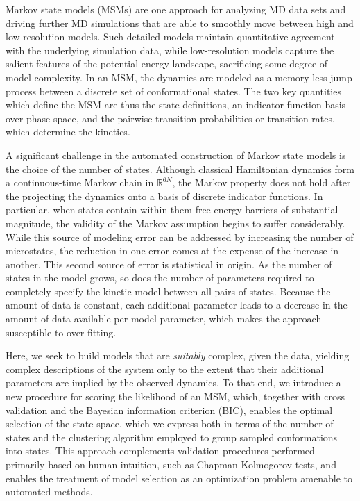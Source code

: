 \documentclass[twocolumn,floatfix,nofootinbib,aps]{revtex4-1}
\begin{document}
Markov state models (MSMs) are one approach for analyzing MD data sets and driving further MD simulations that are able to smoothly move between high and low-resolution models. Such detailed models maintain quantitative agreement with the underlying simulation data, while low-resolution models capture the salient features of the potential energy landscape, sacrificing some degree of model complexity. In an MSM, the dynamics are modeled as a memory-less jump process between a discrete set of conformational states. The two key quantities which define the MSM are thus the state definitions, an indicator function basis over phase space, and the pairwise transition probabilities or transition rates, which determine the kinetics.

A significant challenge in the automated construction of Markov state models is the choice of the number of states. Although classical Hamiltonian dynamics form a continuous-time Markov chain in $\mathbb{R}^{6N}$, the Markov property does not hold after the projecting the dynamics onto a basis of discrete indicator functions. In particular, when states contain within them free energy barriers of substantial magnitude, the validity of the Markov assumption begins to suffer considerably. While this source of modeling error can be addressed by increasing the number of microstates, the reduction in one error comes at the expense of the increase in another. This second source of error is statistical in origin. As the number of states in the model grows, so does the number of parameters required to completely specify the kinetic model between all pairs of states. Because the amount of data is constant, each additional parameter leads to a decrease in the amount of data available per model parameter, which makes the approach susceptible to over-fitting.

Here, we seek to build models that are \emph{suitably} complex, given the data, yielding complex descriptions of the system only to the extent that their additional parameters are implied by the observed dynamics. To that end, we introduce a new procedure for scoring the likelihood of an MSM, which, together with cross validation and the Bayesian information criterion (BIC), enables the optimal selection of the state space, which we express both in terms of the number of states and the clustering algorithm employed to group sampled conformations into states. This approach complements validation procedures performed primarily based on human intuition, such as Chapman-Kolmogorov tests, and enables the treatment of model selection as an optimization problem amenable to automated methods.
\end{document}
